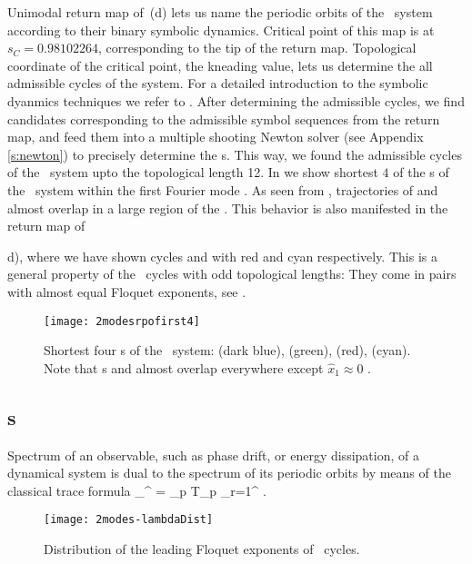 {{{{{{{{Unimodal return map of \,(d) lets us name the
periodic orbits of the \twomode\ system according to their binary
symbolic dynamics. Critical point of this map is at $s_C=0.98102264$,
corresponding to the tip of the return map. Topological coordinate of the
critical point, the kneading value, lets us determine the all admissible
cycles of the system. For a detailed introduction to the symbolic
dyanmics techniques we refer to . After determining the
admissible cycles, we find candidates corresponding to the admissible
symbol sequences from the return map, and feed them into a multiple
shooting Newton solver (see Appendix \ref{s:newton}) to precisely
determine the \rpo s. This way, we found the admissible cycles of the
\twomode\ system upto the topological length 12. In
 we show shortest $4$ of the \rpo s of the
\twomode\ system within the first Fourier mode \slicePlane . As seen from
, trajectories of  and 
almost overlap in a large region of the \statesp . This behavior is also
manifested in the return map of \,{d), where
we have shown cycles  and  with red and cyan
respectively. This is a general property of the \twomode\ cycles with odd
topological lengths: They come in pairs with almost equal Floquet
exponents, see .

\begin{figure}%
\centering
 \texttt{[image: 2modesrpofirst4]}
\caption{Shortest four \rpo s of the \twomode\ system:  (dark blue),  (green),  (red),  (cyan). Note that \rpo s  and  almost overlap everywhere except $\hat{x}_1 \approx 0$ .}
\label{f-2modesrpofirst4}
\end{figure}

\subsection{\CycForm s}
\label{s:DynAvers}

Spectrum of an observable, such as phase drift, or energy dissipation, of
a dynamical system is dual to the spectrum of its periodic orbits by
means of the classical trace formula
\beq
\sum_{}^{\infty}  = \sum_p T_p \sum_{r=1}^{\infty}  .

\begin{figure}%
\centering
 \texttt{[image: 2modes-lambdaDist]}
\caption{Distribution of the leading Floquet exponents of \twomode\ cycles.}
\label{f-2modes-lambdaDist}
\end{figure}


}}}}}}}}}
